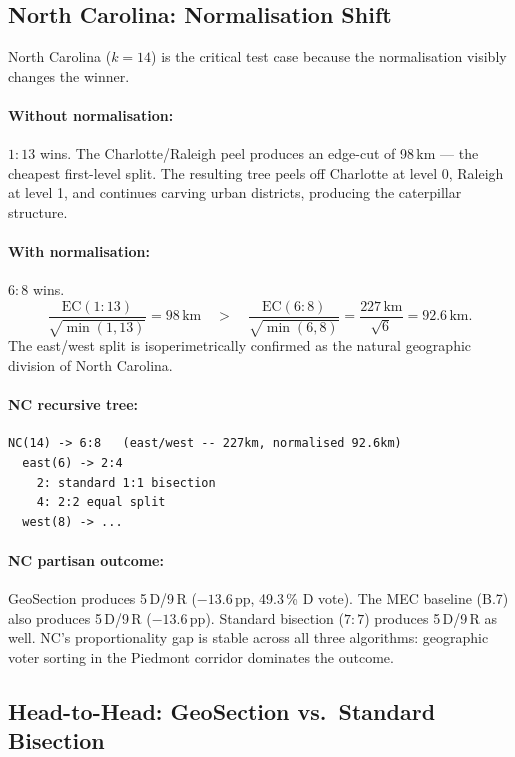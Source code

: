 \subsection{North Carolina: Normalisation Shift}
\label{sec:nc}

North Carolina ($k=14$) is the critical test case because the normalisation
visibly changes the winner.

\paragraph{Without normalisation:} $1:13$ wins.
The Charlotte/Raleigh peel produces an edge-cut of 98\,km --- the cheapest
first-level split.
The resulting tree peels off Charlotte at level 0, Raleigh at level 1,
and continues carving urban districts, producing the caterpillar structure.

\paragraph{With normalisation:} $6:8$ wins.
\[
  \frac{\mathrm{EC}(1:13)}{\sqrt{\min(1,13)}} = 98\,\text{km}
  \quad>\quad
  \frac{\mathrm{EC}(6:8)}{\sqrt{\min(6,8)}} = \frac{227\,\text{km}}{\sqrt{6}} = 92.6\,\text{km}.
\]
The east/west split is isoperimetrically confirmed as the natural geographic
division of North Carolina.

\paragraph{NC recursive tree:}
\begin{verbatim}
NC(14) -> 6:8   (east/west -- 227km, normalised 92.6km)
  east(6) -> 2:4
    2: standard 1:1 bisection
    4: 2:2 equal split
  west(8) -> ...
\end{verbatim}

\paragraph{NC partisan outcome:}
GeoSection produces 5\,D/9\,R ($-13.6$\,pp, 49.3\,\% D vote).
The MEC baseline (B.7) also produces 5\,D/9\,R ($-13.6$\,pp).
Standard bisection ($7:7$) produces 5\,D/9\,R as well.
NC's proportionality gap is stable across all three algorithms:
geographic voter sorting in the Piedmont corridor dominates the outcome.

\subsection{Head-to-Head: GeoSection vs.\ Standard Bisection}
\label{sec:comparison}

